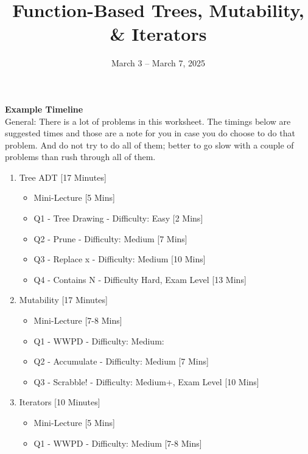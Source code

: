 \documentclass{exam}
\title{Function-Based Trees, Mutability, \& Iterators}
\date{March 3 -- March 7, 2025}
\begin{document}
\maketitle

\begin{meta}
    \textbf{Example Timeline}\\
    General: There is a lot of problems in this worksheet. The timings below are suggested times and those are a note for you in case you do choose to do that problem. And do not try to do all of them; better to go slow with a couple of problems than rush through all of them.
    \begin{enumerate}
        \item Tree ADT [17 Minutes] {\begin{itemize} 
        \item Mini-Lecture [5 Mins]
        \item Q1 - Tree Drawing - Difficulty: Easy [2 Mins]
        \item Q2 - Prune - Difficulty: Medium [7 Mins]
        \item Q3 - Replace x - Difficulty: Medium [10 Mins]
        \item Q4 - Contains N - Difficulty Hard, Exam Level [13 Mins]
        \end{itemize}}
        \item Mutability [17 Minutes] {\begin{itemize} 
            \item Mini-Lecture [7-8 Mins]
            \item Q1 - WWPD - Difficulty: Medium: 
            \item Q2 - Accumulate - Difficulty: Medium [7 Mins]
            \item Q3 - Scrabble! - Difficulty: Medium+, Exam Level [10 Mins]
        \end{itemize}}
        \item Iterators [10 Minutes] {\begin{itemize} 
            \item Mini-Lecture [5 Mins]
            \item Q1 - WWPD - Difficulty: Medium [7-8 Mins]
        \end{itemize}}
    \end{enumerate}


\end{meta}
\end{document}
